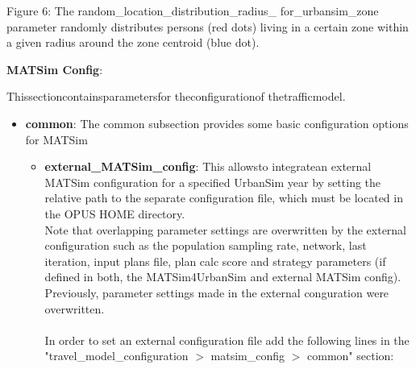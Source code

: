 
Figure 6: The random\_location\_distribution\_radius\_ for\_urbansim\_zone  parameter randomly distributes persons (red dots) living in a certain  zone within a given radius around the zone centroid (blue dot).

\textbf{MATSim Config}:

Thissectioncontainsparametersfor theconfigurationof thetrafficmodel.
\begin{itemize}
	\item \textbf{common}: The common subsection provides some basic configuration options for MATSim   
\begin{itemize}
	\item \textbf{external\_MATSim\_config}: This allowsto integratean external MATSim configuration for a specified UrbanSim year by setting the relative path to the separate configuration file, which must be located in the OPUS HOME directory.
\\Note  that overlapping parameter settings are overwritten by the external  configuration such as the population sampling rate, network, last  iteration, input plans file, plan calc score and strategy parameters (if  defined in both, the MATSim4UrbanSim and external MATSim config).
\\     Previously, parameter settings made in the external conguration were overwritten.
\\
\\     In order to set an external configuration file add the following  lines in the "travel\_model\_configuration $>$ matsim\_config $>$ common"  section:
\\
\begin{verbatim}


\end{verbatim}
\end{itemize}
\end{itemize}
